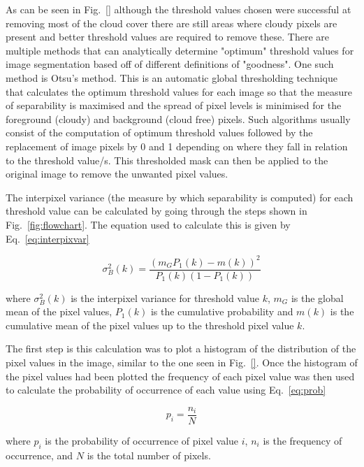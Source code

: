 As can be seen in Fig.~\ref{} although the threshold values chosen were successful at removing most of the cloud cover there are still areas where cloudy pixels are present and better threshold values are required to remove these. There are multiple methods that can analytically determine "optimum" threshold values for image segmentation based off of different definitions of "goodness". One such method is Otsu's method. This is an automatic global thresholding technique that calculates the optimum threshold values for each image so that the measure of separability is maximised and the spread of pixel levels is minimised for the foreground (cloudy) and background (cloud free) pixels. Such algorithms usually consist of the computation of optimum threshold values followed by the replacement of image pixels by 0 and 1 depending on where they fall in relation to the threshold value/s. This thresholded mask can then be applied to the original image to remove the unwanted pixel values.

\par
The interpixel variance (the measure by which separability is computed) for each threshold value can be calculated by going through the steps shown in Fig.~\ref{fig:flowchart}. The equation used to calculate this is given by Eq.~\ref{eq:interpixvar}

\begin{equation}\label{eq:interpixvar}
\sigma_{B}^{2}(k)=\frac{\left(m_{G} P_{1}(k)-m(k)\right)^{2}}{P_{1}(k)\left(1-P_{1}(k)\right)}
\end{equation}

where $\sigma_{B}^{2}(k)$ is the interpixel variance for threshold value $k$, $m_G$ is the global mean of the pixel values, $P_{1}(k)$ is the cumulative probability and $m(k)$ is the cumulative mean of the pixel values up to the threshold pixel value $k$.

\par
The first step is this calculation was to plot a histogram of the distribution of the pixel values in the image, similar to the one seen in Fig.~\ref{}. Once the histogram of the pixel values had been plotted the frequency of each pixel value was then used to calculate the probability of occurrence of each value using Eq.~\ref{eq:prob}

\begin{equation}\label{eq:prob}
p_{i}=\frac{n_{i}}{N}
\end{equation}

where $p_{i}$ is the probability of occurrence of pixel value $i$, $n_{i}$ is the frequency of occurrence, and $N$ is the total number of pixels.

